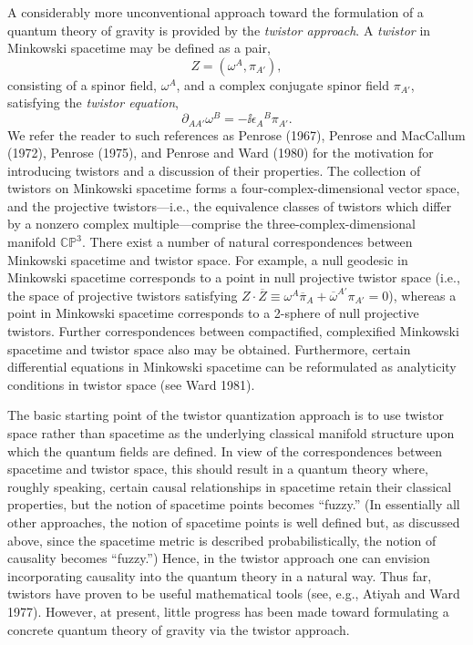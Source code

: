 A considerably more unconventional approach toward the formulation of a quantum
theory of gravity is provided by the \emph{twistor approach}. A \emph{twistor} in Minkowski
spacetime may be defined as a pair,
\begin{equation}
  Z=(\omega^A,\pi_{A'}),
  \tag{14.1.9}\label{eq:14.1.9}
\end{equation}
consisting of a spinor field, \(\omega^A\), and a complex conjugate spinor field
\(\pi_{A'}\), satisfying the \emph{twistor equation},
\begin{equation}
  \partial_{AA'}\omega^B=-\ii\epsilon_A{}^B\pi_{A'}.
  \tag{14.1.10}\label{eq:14.1.10}
\end{equation}
We refer the reader to such references as Penrose (1967), Penrose and MacCallum
(1972), Penrose (1975), and Penrose and Ward (1980) for the motivation for
introducing twistors and a discussion of their properties. The collection of twistors on
Minkowski spacetime forms a four-complex-dimensional vector space, and the
projective twistors---i.e., the equivalence classes of twistors which differ by a nonzero
complex multiple---comprise the three-complex-dimensional manifold \(\mathbb{CP}^3\).
There exist a number of natural correspondences between Minkowski spacetime and
twistor space. For example, a null geodesic in Minkowski spacetime corresponds to
a point in null projective twistor space (i.e., the space of projective twistors satisfying
\(Z\mathbin{\cdot}\overline Z\equiv
\omega^A\overline\pi_A+\overline\omega^{A'}\pi_{A'}=0\)), whereas a point in
Minkowski spacetime corresponds to a 2-sphere of null projective twistors. Further
correspondences between compactified, complexified Minkowski spacetime and twistor
space also may be obtained. Furthermore, certain differential equations in Minkowski
spacetime can be reformulated as analyticity conditions in twistor space (see Ward 1981).

The basic starting point of the twistor quantization approach is to use twistor space
rather than spacetime as the underlying classical manifold structure upon which the
quantum fields are defined. In view of the correspondences between spacetime and
twistor space, this should result in a quantum theory where, roughly speaking,
certain causal relationships in spacetime retain their classical properties, but the
notion of spacetime points becomes ``fuzzy.'' (In essentially all other approaches, the
notion of spacetime points is well defined but, as discussed above, since the spacetime
metric is described probabilistically, the notion of causality becomes ``fuzzy.'')
Hence, in the twistor approach one can envision incorporating causality into the
quantum theory in a natural way. Thus far, twistors have proven to be useful
mathematical tools (see, e.g., Atiyah and Ward 1977). However, at present, little
progress has been made toward formulating a concrete quantum theory of gravity via
the twistor approach.

